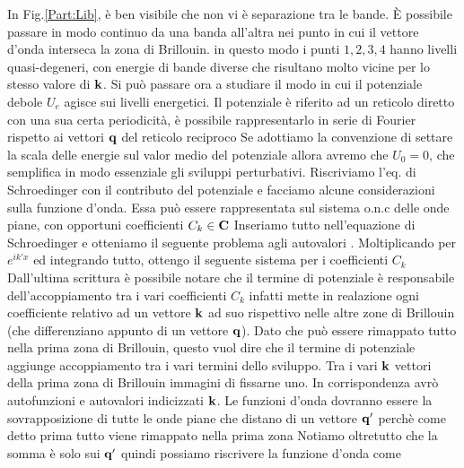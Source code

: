 \documentclass[a4paper,12pt]{article}
\begin{document}
In Fig.\ref{Part:Lib}, è ben visibile che non vi è separazione tra le bande. \`E possibile passare in modo continuo da una banda all'altra nei punto in cui il vettore d'onda interseca la zona di Brillouin. in questo modo i punti $1,2,3,4$ hanno livelli quasi-degeneri, con energie di bande diverse che risultano molto vicine per lo stesso valore di $\it\bf k$. Si può passare ora a studiare il modo in cui il potenziale debole $U_e$ agisce sui livelli energetici. Il potenziale è riferito ad un reticolo diretto con una sua certa periodicità, è possibile rappresentarlo in serie di Fourier rispetto ai vettori $\it\bf q$ del reticolo reciproco 
Se adottiamo la convenzione di settare la scala delle energie sul valor medio del potenziale allora avremo che $U_0=0$, che semplifica in modo essenziale gli sviluppi perturbativi. Riscriviamo l'eq. di Schroedinger con il contributo del potenziale
e facciamo alcune considerazioni sulla funzione d'onda. Essa può essere rappresentata sul sistema o.n.c delle onde piane, con opportuni coefficienti $C_k\in\mathbf{C}$
Inseriamo tutto nell'equazione di Schroedinger e otteniamo il seguente problema agli autovalori
.
Moltiplicando per $e^{ik'x}$ ed integrando tutto, ottengo il seguente sistema per i coefficienti $C_k$
Dall'ultima scrittura è possibile notare che il termine di potenziale è responsabile dell'accoppiamento tra i vari coefficienti $C_k$ infatti mette in realazione ogni coefficiente relativo ad un vettore $\it\bf k$ ad suo rispettivo nelle altre zone di Brillouin (che differenziano appunto di un vettore $\it\bf q$). Dato che può essere rimappato tutto nella prima zona di Brillouin, questo vuol dire che il termine di potenziale aggiunge accoppiamento tra i vari termini dello sviluppo. Tra i vari $\it\bf k$ vettori della prima zona di Brillouin immagini di fissarne uno. In corrispondenza avrò autofunzioni e autovalori indicizzati $\it\bf k$. Le funzioni d'onda dovranno essere la sovrapposizione di tutte le onde piane che distano di un vettore $\it\bf q'$ perchè come detto prima tutto viene rimappato nella prima zona
Notiamo oltretutto che la somma è solo sui $\it\bf q'$ quindi possiamo riscrivere la funzione d'onda come
\end{document}
